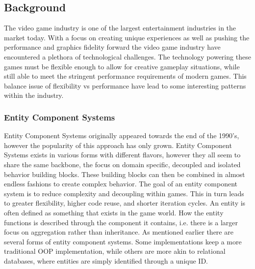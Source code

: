 \subsection{Background}
The video game industry is one of the largest entertainment industries in the market today. 
With a focus on creating unique experiences as well as pushing the performance and graphics fidelity
forward the video game industry have encountered a plethora of technological challenges.
The technology powering these games must be flexible enough to allow for creative gameplay situations, 
while still able to meet the stringent performance requirements of modern games.
This balance issue of flexibility vs performance have lead to some interesting patterns within the industry.

\subsubsection{Entity Component Systems}
Entity Component Systems originally appeared towards the end of the 1990's, 
however the popularity of this approach has only grown. 
\cite{wikipedia_ecs_history}
Entity Component Systems exists in various forms with different flavors,
however they all seem to share the same backbone, the focus on domain specific, 
decoupled and isolated behavior building blocks.
These building blocks can then be combined in almost endless fashions to create complex behavior. 
The goal of an entity component system is to reduce complexity and decoupling within games. 
This in turn leads to greater flexibility, higher code reuse, and shorter iteration cycles. 
An entity is often defined as something that exists in the game world. 
How the entity functions is described through the component it contains, 
i.e. there is a larger focus on aggregation rather than inheritance. 
\cite[components]{game_programming_patterns}
As mentioned earlier there are several forms of entity component systems. 
Some implementations keep a more traditional OOP implementation, 
\cite[components]{game_programming_patterns}
while others are more akin to relational databases, 
where entities are simply identified through a unique ID. 
\cite{t_machine_ecs_are_the_future_p2} 

